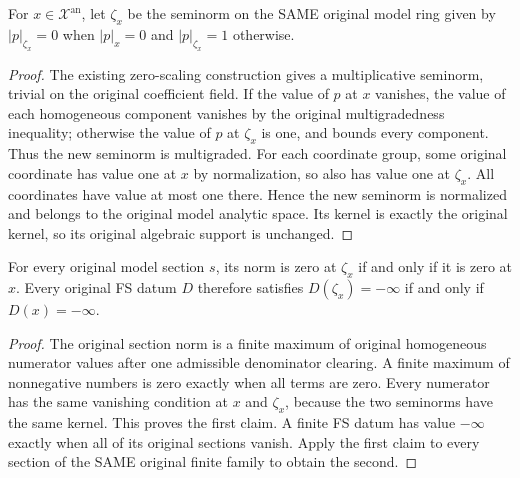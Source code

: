 \begin{definition}
\label{def:seven-original-support-trivial-point}
\leanok
For $x\in\mathcal X^{\mathrm{an}}$, let $\zeta_x$ be the seminorm on the
SAME original model ring given by $|p|_{\zeta_x}=0$ when $|p|_x=0$ and
$|p|_{\zeta_x}=1$ otherwise.
\end{definition}
\begin{proof}
The existing zero-scaling construction gives a multiplicative seminorm,
trivial on the original coefficient field. If the value of $p$ at $x$
vanishes, the value of each homogeneous component vanishes by the original
multigradedness inequality; otherwise the value of $p$ at $\zeta_x$ is one,
and bounds every component. Thus the new seminorm is multigraded. For each
coordinate group, some original coordinate has value one at $x$ by
normalization, so also has value one at $\zeta_x$. All coordinates have
value at most one there. Hence the new seminorm is normalized and belongs
to the original model analytic space. Its kernel is exactly the original
kernel, so its original algebraic support is unchanged.
\end{proof}

\begin{lemma}
\label{lem:seven-original-fs-support-trivial-poles}
\leanok
For every original model section $s$, its norm is zero at $\zeta_x$ if and
only if it is zero at $x$. Every original FS datum $D$ therefore satisfies
$D(\zeta_x)=-\infty$ if and only if $D(x)=-\infty$.
\end{lemma}
\begin{proof}
The original section norm is a finite maximum of original homogeneous
numerator values after one admissible denominator clearing. A finite
maximum of nonnegative numbers is zero exactly when all terms are zero.
Every numerator has the same vanishing condition at $x$ and $\zeta_x$,
because the two seminorms have the same kernel. This proves the first
claim. A finite FS datum has value $-\infty$ exactly when all of its
original sections vanish. Apply the first claim to every section of the
SAME original finite family to obtain the second.
\end{proof}

